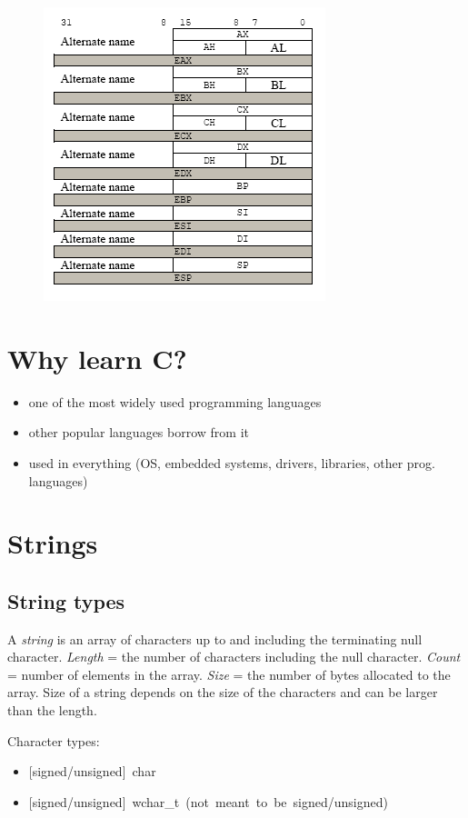 \documentclass[letterpaper]{article}
\newcommand{\p}{\vspace{1em}\par}		%
\begin{document}
\begin{figure}[H]
\centering
\includegraphics[scale=0.70]{registers.png}
\end{figure}


\section{Why learn C?}
\begin{itemize}
\item one of the most widely used programming languages
\item other popular languages borrow from it
\item used in everything (OS, embedded systems, drivers, libraries, other prog. languages)
\end{itemize}

\section{Strings}
\subsection{String types}
A \emph{string} is an array of characters up to and including the terminating null character. \emph{Length} = the number of characters including the null character. \emph{Count} = number of elements in the array. \emph{Size} = the number of bytes allocated to the array. Size of a string depends on the size of the characters and can be larger than the length.

\p Character types:
\begin{itemize}
\item \mbox{[signed/unsigned] char}
\item \mbox{[signed/unsigned] wchar\_t (not meant to be signed/unsigned)}
\end{itemize}
\end{document}
